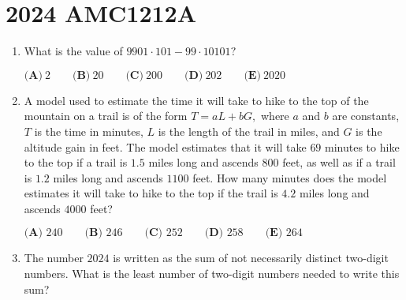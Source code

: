 \documentclass{article}
\begin{document}
\newpage\section*{2024 AMC1212A}\begin{enumerate}[label=\arabic*., itemsep=0.5em]\item What is the value of $9901\cdot101-99\cdot10101?$

$\textbf{(A)}~2\qquad\textbf{(B)}~20\qquad\textbf{(C)}~200\qquad\textbf{(D)}~202\qquad\textbf{(E)}~2020$\par \vspace{0.5em}\item A model used to estimate the time it will take to hike to the top of the mountain on a trail is of the form $T=aL+bG,$ where $a$ and $b$ are constants, $T$ is the time in minutes, $L$ is the length of the trail in miles, and $G$ is the altitude gain in feet. The model estimates that it will take $69$ minutes to hike to the top if a trail is $1.5$ miles long and ascends $800$ feet, as well as if a trail is $1.2$ miles long and ascends $1100$ feet. How many minutes does the model estimates it will take to hike to the top if the trail is $4.2$ miles long and ascends $4000$ feet?

$\textbf{(A) }240\qquad\textbf{(B) }246\qquad\textbf{(C) }252\qquad\textbf{(D) }258\qquad\textbf{(E) }264$\par \vspace{0.5em}\item The number $2024$ is written as the sum of not necessarily distinct two-digit numbers. What is the least number of two-digit numbers needed to write this sum?


\end{enumerate}
\end{document}
